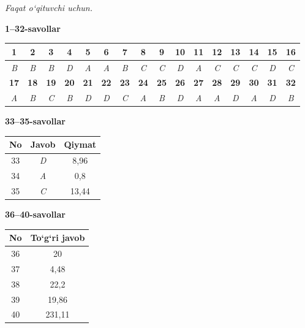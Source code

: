 \documentclass[11pt,a4paper]{article}
\begin{document}
\textit{Faqat o`qituvchi uchun.}\par\medskip
\noindent\textbf{1--32-savollar}\par\smallskip
\noindent\begin{tabular}{|c|c|c|c|c|c|c|c|c|c|c|c|c|c|c|c|}\hline
\textbf{1} & \textbf{2} & \textbf{3} & \textbf{4} & \textbf{5} & \textbf{6} & \textbf{7} & \textbf{8} & \textbf{9} & \textbf{10} & \textbf{11} & \textbf{12} & \textbf{13} & \textbf{14} & \textbf{15} & \textbf{16}\\\hline
\textsl{B} & \textsl{B} & \textsl{B} & \textsl{D} & \textsl{A} & \textsl{A} & \textsl{B} & \textsl{C} & \textsl{C} & \textsl{D} & \textsl{A} & \textsl{C} & \textsl{C} & \textsl{C} & \textsl{D} & \textsl{C}\\\hline
\textbf{17} & \textbf{18} & \textbf{19} & \textbf{20} & \textbf{21} & \textbf{22} & \textbf{23} & \textbf{24} & \textbf{25} & \textbf{26} & \textbf{27} & \textbf{28} & \textbf{29} & \textbf{30} & \textbf{31} & \textbf{32}\\\hline
\textsl{A} & \textsl{B} & \textsl{C} & \textsl{B} & \textsl{D} & \textsl{D} & \textsl{C} & \textsl{A} & \textsl{B} & \textsl{D} & \textsl{A} & \textsl{A} & \textsl{D} & \textsl{A} & \textsl{D} & \textsl{B}\\\hline
\end{tabular}\par\medskip
\noindent\textbf{33--35-savollar}\par\smallskip
\noindent\begin{tabular}{|c|c|c|}\hline \textbf{No} & \textbf{Javob} & \textbf{Qiymat}\\\hline
33 & \textsl{D} & 8,96\\\hline
34 & \textsl{A} & 0,8\\\hline
35 & \textsl{C} & 13,44\\\hline
\end{tabular}\par\medskip
\noindent\textbf{36--40-savollar}\par\smallskip
\noindent\begin{tabular}{|c|c|}\hline \textbf{No} & \textbf{To`g`ri javob}\\\hline
36 & 20\\\hline
37 & 4,48\\\hline
38 & 22,2\\\hline
39 & 19,86\\\hline
40 & 231,11\\\hline
\end{tabular}\par\medskip
\end{document}
